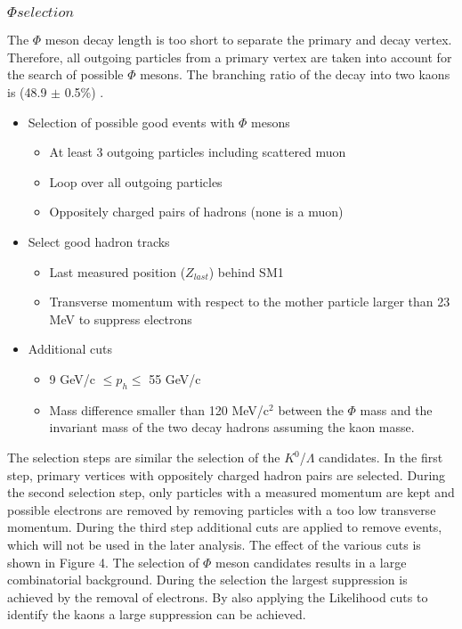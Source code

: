 \subsubsection{$\Phi selection$}

The $\Phi$ meson decay length is too short to separate the primary and decay vertex. Therefore, all outgoing particles from a primary vertex are taken into account for the search
of possible $\Phi$ mesons. The branching ratio of the decay into two kaons is (48.9 $\pm$ 0.5\%) \cite{}.

\begin{itemize}
  \item Selection of possible good events with $\Phi$ mesons
  \begin{itemize}
    \item At least 3 outgoing particles including scattered muon
    \item Loop over all outgoing particles
    \item Oppositely charged pairs of hadrons (none is a muon)
  \end{itemize}
  \item Select good hadron tracks
  \begin{itemize}
    \item Last measured position ($Z_{last}$) behind SM1
    \item Transverse momentum with respect to the mother particle larger than 23 MeV to suppress electrons
  \end{itemize}
  \item Additional cuts
  \begin{itemize}
    \item 9 GeV/c $\leq p_h \leq$ 55 GeV/c
    \item Mass difference smaller than 120 MeV/c$^2$ between the $\Phi$ mass and the invariant mass of the two decay hadrons assuming the kaon masse.
  \end{itemize}
\end{itemize}

The selection steps are similar the selection of the $K^0$/$\Lambda$ candidates. In the first step, primary vertices with oppositely charged hadron pairs are selected. During the
second selection step, only particles with a measured momentum are kept and possible electrons are removed by removing particles with a too low transverse momentum.
During the third step additional cuts are applied to remove events, which will not be used in the later analysis. The effect of the various cuts is shown in Figure 4.
The selection of $\Phi$ meson candidates results in a large combinatorial background. During the selection the largest suppression is achieved by the removal of electrons.
By also applying the Likelihood cuts to identify the kaons a large suppression can be achieved.

